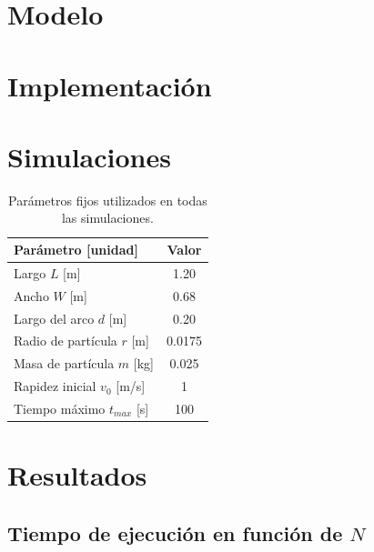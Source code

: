 \documentclass[11pt,a4paper]{article}
\begin{document}
\FloatBarrier
\section{Modelo}
\label{sec:modelo}


\FloatBarrier
\section{Implementación}
\label{sec:implementacion}


\FloatBarrier
\section{Simulaciones}
\label{sec:simulaciones}

\begin{table}[H]
  \centering
  \begin{tabular}{@{}lc@{}}
    \toprule
    Parámetro [unidad] & Valor \\
    \midrule
    Largo $L$ [m] & 1.20 \\
    Ancho $W$ [m] & 0.68 \\
    Largo del arco $d$ [m] & 0.20 \\
    Radio de partícula $r$ [m] & 0.0175 \\
    Masa de partícula $m$ [kg] & 0.025 \\
    Rapidez inicial $v_0$ [m/s] & 1 \\
    Tiempo máximo $t_{max}$ [s] & 100 \\
    \bottomrule
  \end{tabular}
  \caption{Parámetros fijos utilizados en todas las simulaciones.}
  \label{fig:parametros}
\end{table}

\FloatBarrier
\section{Resultados}
\label{sec:resultados}

\subsection{Tiempo de ejecución en función de $N$}
\label{sec:resultados-tiempo}
\end{document}
